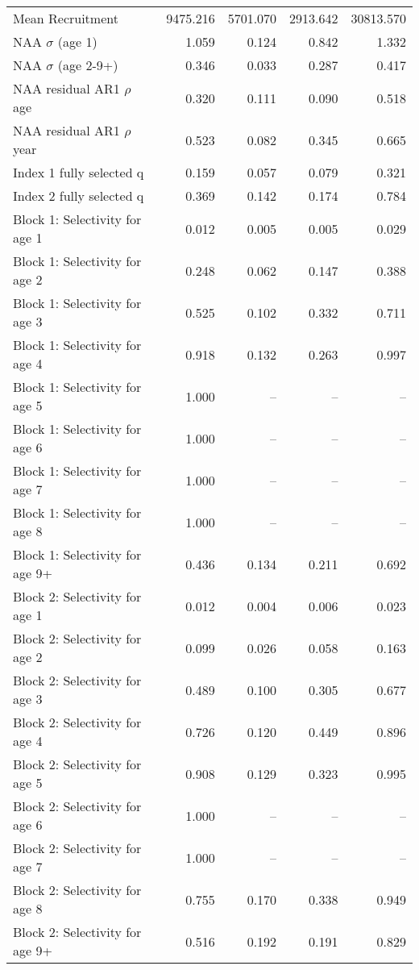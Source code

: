 \documentclass[
]{article}
\begin{document}
\begin{landscape}
\begin{longtable}[t]{lrrrr}
\endfoot
\bottomrule
\endlastfoot
Mean Recruitment & 9475.216 & 5701.070 & 2913.642 & 30813.570\\
NAA $\sigma$ (age 1) & 1.059 & 0.124 & 0.842 & 1.332\\
NAA $\sigma$ (age 2-9+) & 0.346 & 0.033 & 0.287 & 0.417\\
NAA residual AR1 $\rho$ age & 0.320 & 0.111 & 0.090 & 0.518\\
NAA residual AR1 $\rho$ year & 0.523 & 0.082 & 0.345 & 0.665\\
\addlinespace
Index 1 fully selected q & 0.159 & 0.057 & 0.079 & 0.321\\
Index 2 fully selected q & 0.369 & 0.142 & 0.174 & 0.784\\
Block 1: Selectivity for age 1 & 0.012 & 0.005 & 0.005 & 0.029\\
Block 1: Selectivity for age 2 & 0.248 & 0.062 & 0.147 & 0.388\\
Block 1: Selectivity for age 3 & 0.525 & 0.102 & 0.332 & 0.711\\
\addlinespace
Block 1: Selectivity for age 4 & 0.918 & 0.132 & 0.263 & 0.997\\
Block 1: Selectivity for age 5 & 1.000 & -- & -- & --\\
Block 1: Selectivity for age 6 & 1.000 & -- & -- & --\\
Block 1: Selectivity for age 7 & 1.000 & -- & -- & --\\
Block 1: Selectivity for age 8 & 1.000 & -- & -- & --\\
\addlinespace
Block 1: Selectivity for age 9+ & 0.436 & 0.134 & 0.211 & 0.692\\
Block 2: Selectivity for age 1 & 0.012 & 0.004 & 0.006 & 0.023\\
Block 2: Selectivity for age 2 & 0.099 & 0.026 & 0.058 & 0.163\\
Block 2: Selectivity for age 3 & 0.489 & 0.100 & 0.305 & 0.677\\
Block 2: Selectivity for age 4 & 0.726 & 0.120 & 0.449 & 0.896\\
\addlinespace
Block 2: Selectivity for age 5 & 0.908 & 0.129 & 0.323 & 0.995\\
Block 2: Selectivity for age 6 & 1.000 & -- & -- & --\\
Block 2: Selectivity for age 7 & 1.000 & -- & -- & --\\
Block 2: Selectivity for age 8 & 0.755 & 0.170 & 0.338 & 0.949\\
Block 2: Selectivity for age 9+ & 0.516 & 0.192 & 0.191 & 0.829\\

\end{longtable}
\end{landscape}
\end{document}

